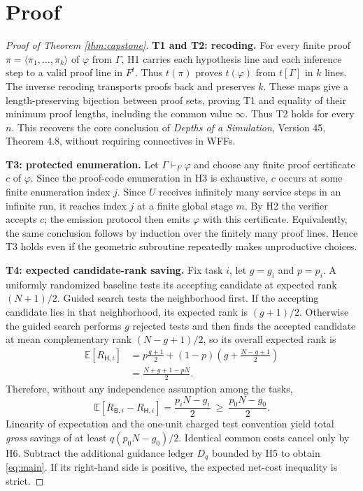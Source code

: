 \documentclass[11pt,letterpaper]{article}
\theoremstyle{definition}
\theoremstyle{remark}
\newcommand{\E}{\mathbb{E}}
\newcommand{\Hsys}{\mathsf H}
\newcommand{\Bsys}{\mathsf B}
\begin{document}
\section{Proof}
\begin{proof}[Proof of Theorem \ref{thm:capstone}]
\textbf{T1 and T2: recoding.}
For every finite proof $\pi=\langle\pi_1,\dots,\pi_k\rangle$ of $\varphi$ from $\Gamma$, H1 carries each hypothesis line and each inference step to a valid proof line in $F^t$. Thus $t(\pi)$ proves $t(\varphi)$ from $t[\Gamma]$ in $k$ lines. The inverse recoding transports proofs back and preserves $k$. These maps give a length-preserving bijection between proof sets, proving T1 and equality of their minimum proof lengths, including the common value $\infty$. Thus T2 holds for every $n$. This recovers the core conclusion of \emph{Depths of a Simulation}, Version 45, Theorem 4.8, without requiring connectives in WFFs.

\medskip\noindent\textbf{T3: protected enumeration.}
Let $\Gamma\vdash_F\varphi$ and choose any finite proof certificate $c$ of $\varphi$. Since the proof-code enumeration in H3 is exhaustive, $c$ occurs at some finite enumeration index $j$. Since $U$ receives infinitely many service steps in an infinite run, it reaches index $j$ at a finite global stage $m$. By H2 the verifier accepts $c$; the emission protocol then emits $\varphi$ with this certificate. Equivalently, the same conclusion follows by induction over the finitely many proof lines. Hence T3 holds even if the geometric subroutine repeatedly makes unproductive choices.

\medskip\noindent\textbf{T4: expected candidate-rank saving.}
Fix task $i$, let $g=g_i$ and $p=p_i$. A uniformly randomized baseline tests its accepting candidate at expected rank $(N+1)/2$. Guided search tests the neighborhood first. If the accepting candidate lies in that neighborhood, its expected rank is $(g+1)/2$. Otherwise the guided search performs $g$ rejected tests and then finds the accepted candidate at mean complementary rank $(N-g+1)/2$, so its overall expected rank is
\begin{align*}
 \E[R_{\Hsys,i}]&=p\frac{g+1}{2}+(1-p)\left(g+\frac{N-g+1}{2}\right)\\
 &=\frac{N+g+1-pN}{2}.
\end{align*}
Therefore, without any independence assumption among the tasks,
\[
 \E[R_{\Bsys,i}-R_{\Hsys,i}]=\frac{p_iN-g_i}{2}\ \ge\ \frac{p_0N-g_0}{2}.
\]
Linearity of expectation and the one-unit charged test convention yield total \emph{gross} savings of at least $q(p_0N-g_0)/2$. Identical common costs cancel only by H6. Subtract the additional guidance ledger $D_q$ bounded by H5 to obtain \eqref{eq:main}. If its right-hand side is positive, the expected net-cost inequality is strict.


\end{proof}
\end{document}
